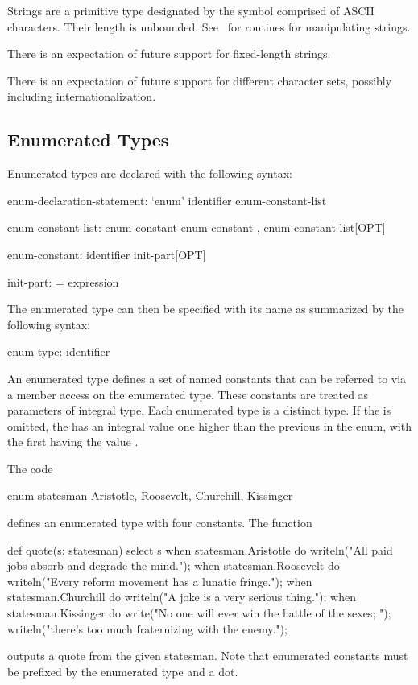 Strings are a primitive type designated by the symbol 
comprised of ASCII characters.  Their length is unbounded.
See~ for routines for manipulating strings.


\begin{openissue}
There is an expectation of future support for fixed-length strings.
\end{openissue}

\begin{openissue}
There is an expectation of future support for different character
sets, possibly including internationalization.
\end{openissue}

\subsection{Enumerated Types}
\label{Enumerated_Types}

Enumerated types are declared with the following syntax:
\begin{syntax}
enum-declaration-statement:
  `enum' identifier { enum-constant-list }

enum-constant-list:
  enum-constant
  enum-constant , enum-constant-list[OPT]

enum-constant:
  identifier init-part[OPT]

init-part:
  = expression
\end{syntax}

The enumerated type can then be specified with its name as summarized
by the following syntax:
\begin{syntax}
enum-type:
  identifier
\end{syntax}

An enumerated type defines a set of named constants that can be
referred to via a member access on the enumerated type.
These constants are treated as parameters of integral type.  Each
enumerated type is a distinct type. If the  is
omitted, the  has an integral value one higher
than the previous  in the enum, with the first
having the value .

\begin{example}
The code
\begin{chapel}
enum statesman { Aristotle, Roosevelt, Churchill, Kissinger }
\end{chapel}
defines an enumerated type with four constants.  The function
\begin{chapel}
def quote(s: statesman) {
  select s {
    when statesman.Aristotle do
       writeln("All paid jobs absorb and degrade the mind.");
    when statesman.Roosevelt do
       writeln("Every reform movement has a lunatic fringe.");
    when statesman.Churchill do
       writeln("A joke is a very serious thing.");
    when statesman.Kissinger do
       { write("No one will ever win the battle of the sexes; ");
         writeln("there's too much fraternizing with the enemy."); }
  }
}
\end{chapel}
outputs a quote from the given statesman.  Note that enumerated
constants must be prefixed by the enumerated type and a dot.
\end{example}

